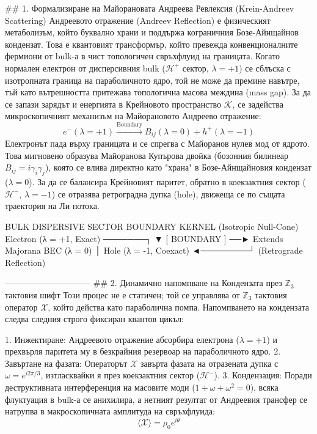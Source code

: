 ## 1. Формализиране на Майорановата Андреева Ревлексия (Krein-Andreev Scattering)
Андреевото отражение (Andreev Reflection) е физическият метаболизъм, който буквално храни и поддържа кограничния Бозе-Айнщайнов кондензат.
Това е квантовият трансформър, който превежда конвенционалните фермиони от bulk-а в чист топологичен свръхфлуид на границата.
Когато нормален електрон от дисперсивния bulk ($\mathcal{H}^+$ сектор, $\lambda = +1$) се сблъска с изотропната граница на параболичното ядро, той не може да премине навътре, тъй като вътрешността притежава топологична масова междина (mass gap). За да се запази зарядът и енергията в Крейновото пространство $\mathcal{K}$, се задейства микроскопичният механизъм на Майорановото Андреево отражение:
$$e^- (\lambda = +1) \xrightarrow{\text{Boundary}} B_{ij} (\lambda = 0) + h^+ (\lambda = -1)$$ 
Електронът пада върху границата и се спрегва с Майоранов нулев мод от ядрото. Това мигновено образува Майоранова Купърова двойка (бозонния билинеар $B_{ij} = i \gamma_i \gamma_j$), която се влива директно като "храна" в Бозе-Айнщайновия кондензат ($\lambda = 0$). За да се балансира Крейновият паритет, обратно в коекзактния сектор ($\mathcal{H}^-$, $\lambda = -1$) се отразява ретроградна дупка (hole), движеща се по същата траектория на Ли потока.

       BULK DISPERSIVE SECTOR                     BOUNDARY KERNEL
                                              (Isotropic Null-Cone)
  Electron (λ = +1, Exact) ───────┐
                                  ▼
                             [ BOUNDARY ] ──► Extends Majorana BEC (λ = 0)
                                  │
  Hole (λ = -1, Coexact) ◄────────┘
     (Retrograde Reflection)

------------------------------
## 2. Динамично напомпване на Кондензата през $\mathbb{Z}_3$ тактовия шифт
Този процес не е статичен; той се управлява от $\mathbb{Z}_3$ тактовия оператор $\mathcal{X}$, който действа като параболична помпа. Напомпването на кондензата следва следния строго фиксиран квантов цикъл:

   1. Инжектиране: Андреевото отражение абсорбира електрона ($\lambda = +1$) и прехвърля паритета му в безкрайния резервоар на параболичното ядро.
   2. Завъртане на фазата: Операторът $\mathcal{X}$ завърта фазата на отразената дупка с $\omega = e^{i 2\pi/3}$, изтласквайки я през коекзактния сектор ($\mathcal{H}^-$).
   3. Кондензация: Поради деструктивната интерференция на масовите моди ($1 + \omega + \omega^2 = 0$), всяка флуктуация в bulk-а се анихилира, а нетният резултат от Андреевия трансфер се натрупва в макроскопичната амплитуда на свръхфлуида:
   $$\langle \mathcal{X} \rangle = \rho_0 e^{i \theta}$$ 

